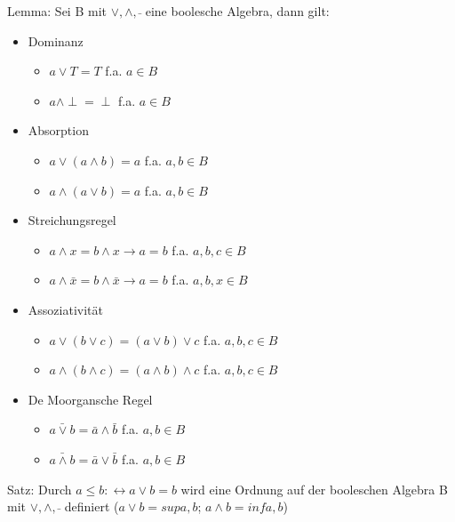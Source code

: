 \documentclass[a4paper]{article}
\begin{document}
\begin{multicols}{3}
    Lemma: Sei B mit $\vee, \wedge, \bar{}$ eine boolesche Algebra, dann gilt:
    \begin{itemize}
        \item Dominanz
              \begin{itemize}
                  \item $a\vee T = T$ f.a. $a\in B$
                  \item $a\wedge \perp = \perp$ f.a. $a\in B$
              \end{itemize}
        \item Absorption
              \begin{itemize}
                  \item $a\vee(a\wedge b)= a$ f.a. $a,b\in B$
                  \item $a\wedge(a\vee b)= a$ f.a. $a,b\in B$
              \end{itemize}
        \item Streichungsregel
              \begin{itemize}
                  \item $a\wedge x = b\wedge x \rightarrow a=b$ f.a. $a,b,c \in B$
                  \item $a\wedge \bar{x} = b\wedge\bar{x} \rightarrow a=b$ f.a. $a,b,x \in B$
              \end{itemize}
        \item Assoziativität
              \begin{itemize}
                  \item $a\vee(b\vee c)=(a\vee b)\vee c$ f.a. $a,b,c\in B$
                  \item $a\wedge(b\wedge c)=(a\wedge b)\wedge c$ f.a. $a,b,c \in B$
              \end{itemize}
        \item De Moorgansche Regel
              \begin{itemize}
                  \item $\bar{a\vee b} = \bar{a}\wedge \bar{b}$ f.a. $a,b\in B$
                  \item $\bar{a\wedge b} = \bar{a}\vee \bar{b}$ f.a. $a,b\in B$
              \end{itemize}
    \end{itemize}
    
    Satz: Durch $a\leq b:\leftrightarrow a\vee b=b$ wird eine Ordnung auf der booleschen Algebra B mit $\vee, \wedge, \bar{}$ definiert ($a\vee b = sup{a,b}$; $a\wedge b = inf{a,b}$)
    

\end{multicols}
\end{document}
